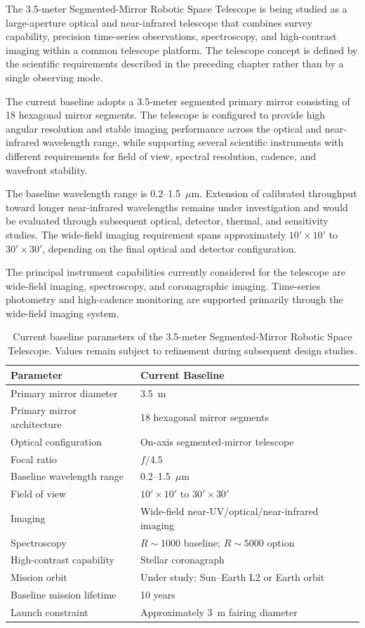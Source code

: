The 3.5-meter Segmented-Mirror Robotic Space Telescope is being studied as
a large-aperture optical and near-infrared telescope that combines survey
capability, precision time-series observations, spectroscopy, and
high-contrast imaging within a common telescope platform. The telescope
concept is defined by the scientific requirements described in the preceding
chapter rather than by a single observing mode.

The current baseline adopts a 3.5-meter segmented primary mirror consisting
of 18 hexagonal mirror segments. The telescope is configured to provide
high angular resolution and stable imaging performance across the optical
and near-infrared wavelength range, while supporting several scientific
instruments with different requirements for field of view, spectral
resolution, cadence, and wavefront stability.

The baseline wavelength range is 0.2--1.5~$\mu$m. Extension of calibrated
throughput toward longer near-infrared wavelengths remains under
investigation and would be evaluated through subsequent optical, detector,
thermal, and sensitivity studies. The wide-field imaging requirement spans
approximately $10' \times 10'$ to $30' \times 30'$, depending on the final
optical and detector configuration.

The principal instrument capabilities currently considered for the
telescope are wide-field imaging, spectroscopy, and coronagraphic imaging.
Time-series photometry and high-cadence monitoring are supported primarily
through the wide-field imaging system.

\begin{table}[ht]
\centering
\caption{Current baseline parameters of the 3.5-meter Segmented-Mirror
Robotic Space Telescope. Values remain subject to refinement during
subsequent design studies.}
\begin{tabular}{ll}
\hline
Parameter & Current Baseline \\
\hline
Primary mirror diameter & 3.5~m \\
Primary mirror architecture & 18 hexagonal mirror segments \\
Optical configuration & On-axis segmented-mirror telescope \\
Focal ratio & $f/4.5$ \\
Baseline wavelength range & 0.2--1.5~$\mu$m \\
Field of view & $10' \times 10'$ to $30' \times 30'$ \\
Imaging & Wide-field near-UV/optical/near-infrared imaging \\
Spectroscopy & $R \sim 1000$ baseline; $R \sim 5000$ option \\
High-contrast capability & Stellar coronagraph \\
Mission orbit & Under study: Sun--Earth L2 or Earth orbit \\
Baseline mission lifetime & 10 years \\
Launch constraint & Approximately 3~m fairing diameter \\
\hline
\end{tabular}
\end{table}

